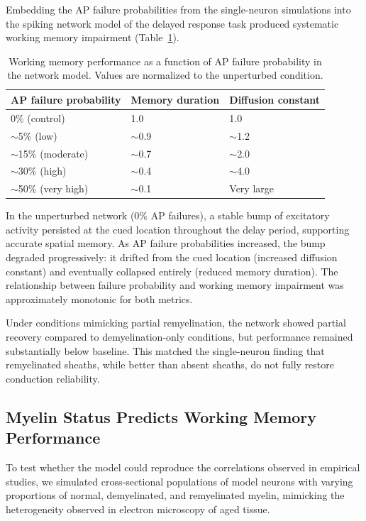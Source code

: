 \documentclass[11pt]{article}
\begin{document}
Embedding the AP failure probabilities from the single-neuron simulations into the spiking network model of the delayed response task produced systematic working memory impairment (Table~\ref{tab:network_wm}).

\begin{table}[ht]
\centering
\caption{Working memory performance as a function of AP failure probability in the network model. Values are normalized to the unperturbed condition.}
\label{tab:network_wm}
\begin{tabular}{lll}
\toprule
AP failure probability & Memory duration & Diffusion constant \\
\midrule
0\% (control) & 1.0 & 1.0 \\
$\sim$5\% (low) & $\sim$0.9 & $\sim$1.2 \\
$\sim$15\% (moderate) & $\sim$0.7 & $\sim$2.0 \\
$\sim$30\% (high) & $\sim$0.4 & $\sim$4.0 \\
$\sim$50\% (very high) & $\sim$0.1 & Very large \\
\bottomrule
\end{tabular}
\end{table}

In the unperturbed network (0\% AP failures), a stable bump of excitatory activity persisted at the cued location throughout the delay period, supporting accurate spatial memory. As AP failure probabilities increased, the bump degraded progressively: it drifted from the cued location (increased diffusion constant) and eventually collapsed entirely (reduced memory duration). The relationship between failure probability and working memory impairment was approximately monotonic for both metrics.

Under conditions mimicking partial remyelination, the network showed partial recovery compared to demyelination-only conditions, but performance remained substantially below baseline. This matched the single-neuron finding that remyelinated sheaths, while better than absent sheaths, do not fully restore conduction reliability.

\subsection{Myelin Status Predicts Working Memory Performance}

To test whether the model could reproduce the correlations observed in empirical studies, we simulated cross-sectional populations of model neurons with varying proportions of normal, demyelinated, and remyelinated myelin, mimicking the heterogeneity observed in electron microscopy of aged tissue.
\end{document}
